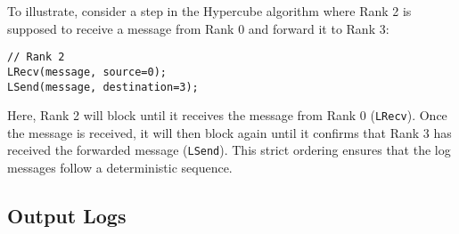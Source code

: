 \documentclass[11pt]{article}
\begin{document}
To illustrate, consider a step in the Hypercube algorithm where Rank 2 is supposed to receive a message from Rank 0 and forward it to Rank 3:

\begin{verbatim}
// Rank 2
LRecv(message, source=0);
LSend(message, destination=3);
\end{verbatim}

Here, Rank 2 will block until it receives the message from Rank 0 (\texttt{LRecv}). Once the message is received, it will then block again until it confirms that Rank 3 has received the forwarded message (\texttt{LSend}). This strict ordering ensures that the log messages follow a deterministic sequence.

\subsection{Output Logs}
\end{document}
